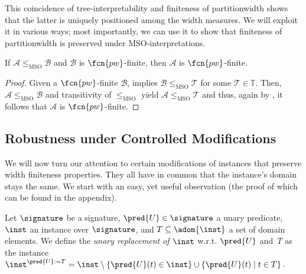 This coincidence of tree-interpretability and finiteness of par\-ti\-tion\-width shows that the latter is uniquely positioned among the width measures. We will exploit it in various ways; 
%
%
most importantly, we can use it to show that finiteness of partitionwidth is preserved under MSO-in\-ter\-pre\-tations.

\begin{theorem}
If $\mathcal{A} \leq_{\text{MSO}} \mathcal{B}$ and $\mathcal{B}$ is $\fcn{pw}$-finite, then $\mathcal{A}$ is $\fcn{pw}$-finite.
\end{theorem}
\begin{proof}
Given a $\fcn{pw}$-finite $\mathcal{B}$,  implies  $\mathcal{B} \leq_{\text{MSO}} \mathcal{T}$ for some $\mathcal{T}\in\mathbb{T}$.
Then, $\mathcal{A} \leq_{\text{MSO}} \mathcal{B}$ and transitivity of $\leq_{\text{MSO}}$ yield $\mathcal{A} \leq_{\text{MSO}} \mathcal{T}$ and thus, again by , it follows that $\mathcal{A}$ is $\fcn{pw}$-finite.
\end{proof}

\subsection{Robustness under Controlled Modifications}\label{sec:preservation}

We will now turn our attention to certain modifications of instances that preserve width finiteness properties. They all have in common that the instance's domain stays the same. We start with an easy, yet useful observation (the proof of which can be found in the appendix).

\begin{definition}
Let $\signature$ be a signature, $\pred{U} \in \signature$ a unary predicate, $\inst$ an instance over $\signature$, and $T \subseteq \adom{\inst}$ a set of domain ele\-ments.
We define the \emph{unary replacement of $\inst$} w.r.t. $\pred{U}$ and~$T$ as the instance $\inst^{\pred{U}:=T} = \inst \setminus \{\pred{U}(t) \in \inst\} \cup \{\pred{U}(t) \mid t \in T \}$.
\end{definition} 

